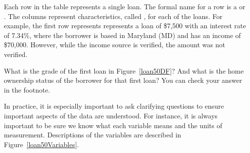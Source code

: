 Each row in the table represents a single loan.
The formal name for a row is a 
or .
The columns represent characteristics,
called ,
for each of the loans.
For example, the first row represents represents a loan of \$7,500 with an interest rate of 7.34\%, where the borrower is based in Maryland (MD) and has an income of \$70,000. However, while the income source is verified, the amount was not verified.

\begin{exercisewrap}
\begin{nexercise}
What is the grade of the first loan in Figure~\ref{loan50DF}?
And what is the home ownership status of the borrower
for that first loan?
You can check your answer in the
footnote.\footnotemark
\end{nexercise}
\end{exercisewrap}

In practice, it is especially important to ask clarifying
questions to ensure important aspects of the data are understood.
For instance, it is always important to be sure we know what
each variable means and the units of measurement.
Descriptions of the  variables are described
in Figure~\ref{loan50Variables}.

